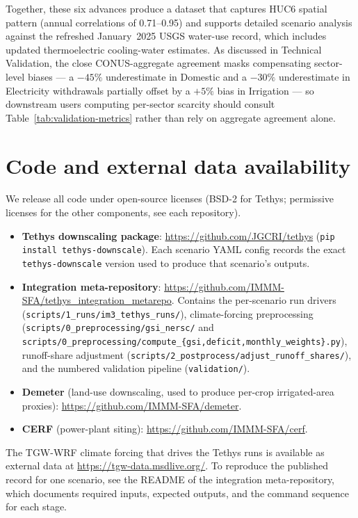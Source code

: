 \documentclass[fleqn,10pt]{wlscirep}
\begin{document}
Together, these six advances produce a dataset that captures HUC6 spatial pattern (annual correlations of 0.71--0.95) and supports detailed scenario analysis against the refreshed January~2025 USGS water-use record, which includes updated thermoelectric cooling-water estimates\cite{skinnerWaterWithdrawalConsumption2025}. As discussed in Technical Validation, the close CONUS-aggregate agreement masks compensating sector-level biases --- a $-45\%$ underestimate in Domestic and a $-30\%$ underestimate in Electricity withdrawals partially offset by a $+5\%$ bias in Irrigation --- so downstream users computing per-sector scarcity should consult Table~\ref{tab:validation-metrics} rather than rely on aggregate agreement alone.

\section*{Code and external data availability}

We release all code under open-source licenses (BSD-2 for Tethys; permissive licenses for the other components, see each repository).
\begin{itemize}
    \item \textbf{Tethys downscaling package}: \url{https://github.com/JGCRI/tethys} (\texttt{pip install tethys-downscale}). Each scenario YAML config records the exact \texttt{tethys-downscale} version used to produce that scenario's outputs.
    \item \textbf{Integration meta-repository}: \url{https://github.com/IMMM-SFA/tethys_integration_metarepo}. Contains the per-scenario run drivers (\texttt{scripts/1\_runs/im3\_tethys\_runs/}), climate-forcing preprocessing (\texttt{scripts/0\_preprocessing/gsi\_nersc/} and \texttt{scripts/0\_preprocessing/compute\_\{gsi,deficit,monthly\_weights\}.py}), runoff-share adjustment (\texttt{scripts/2\_postprocess/adjust\_runoff\_shares/}), and the numbered validation pipeline (\texttt{validation/}).
    \item \textbf{Demeter} (land-use downscaling, used to produce per-crop irrigated-area proxies): \url{https://github.com/IMMM-SFA/demeter}\cite{Vernon-2018}.
    \item \textbf{CERF} (power-plant siting): \url{https://github.com/IMMM-SFA/cerf}\cite{Vernon2021}.
\end{itemize}
The TGW-WRF climate forcing\cite{Jones2023TGW} that drives the Tethys runs is available as external data at \url{https://tgw-data.msdlive.org/}. To reproduce the published record for one scenario, see the README of the integration meta-repository, which documents required inputs, expected outputs, and the command sequence for each stage.
\end{document}
